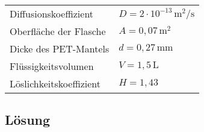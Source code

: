 \documentclass[german,12pt]{homework}
\newcommand{\sis}[1]{\,\si{#1}}
\begin{document}
\begin{problem}
        \begin{center}
            \begin{tabular}{ll}
                \toprule
                Diffusionskoeffizient & \(D = 2 \cdot 10^{-13}\sis{\meter\squared\per\second}\)\\
                Oberfläche der Flasche & \(A = 0,07\sis{\meter\squared}\)\\
                Dicke des PET-Mantels & \(d = 0,27\sis{\milli\meter}\)\\
                Flüssigkeitsvolumen & \(V = 1,5\sis{\liter}\)\\
                Löslichkeitskoeffizient & \(H = 1,43\)\\
                \bottomrule
            \end{tabular}
        \end{center}
    \end{problem}

    \subsection*{Lösung}
\end{document}
